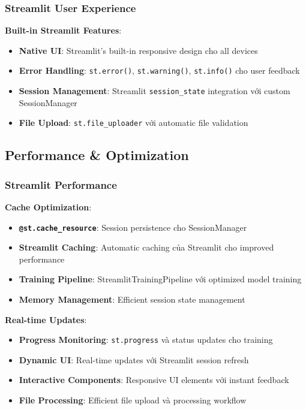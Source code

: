 \subsubsection{Streamlit User Experience}

\textbf{Built-in Streamlit Features}:
\begin{itemize}
    \item \textbf{Native UI}: Streamlit's built-in responsive design cho all devices
    \item \textbf{Error Handling}: \texttt{st.error()}, \texttt{st.warning()}, \texttt{st.info()} cho user feedback
    \item \textbf{Session Management}: Streamlit \texttt{session\_state} integration với custom SessionManager
    \item \textbf{File Upload}: \texttt{st.file\_uploader} với automatic file validation
\end{itemize}

\subsection{Performance \& Optimization}\label{subsec:wizard-optimization}

\subsubsection{Streamlit Performance}

\textbf{Cache Optimization}:
\begin{itemize}
    \item \textbf{\texttt{@st.cache\_resource}}: Session persistence cho SessionManager
    \item \textbf{Streamlit Caching}: Automatic caching của Streamlit cho improved performance
    \item \textbf{Training Pipeline}: StreamlitTrainingPipeline với optimized model training
    \item \textbf{Memory Management}: Efficient session state management
\end{itemize}

\textbf{Real-time Updates}:
\begin{itemize}
    \item \textbf{Progress Monitoring}: \texttt{st.progress} và status updates cho training
    \item \textbf{Dynamic UI}: Real-time updates với Streamlit session refresh
    \item \textbf{Interactive Components}: Responsive UI elements với instant feedback
    \item \textbf{File Processing}: Efficient file upload và processing workflow
\end{itemize}

